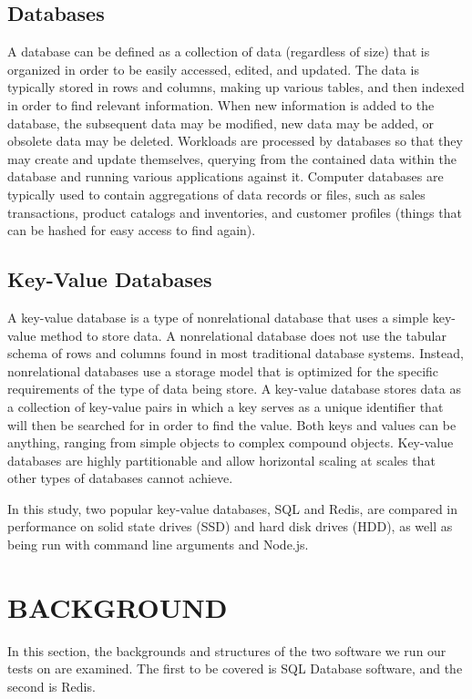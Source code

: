 \documentclass[letterpaper, 10 pt, conference]{ieeeconf}
\begin{document}
\subsection{Databases}
A database can be defined as a collection of data (regardless of size) that is organized in order to be easily accessed, edited, and updated. The data is typically stored in rows and columns, making up various tables, and then indexed in order to find relevant information. When new information is added to the database, the subsequent data may be modified, new data may be added, or obsolete data may be deleted. Workloads are processed by databases so that they may create and update themselves, querying from the contained data within the database and running various applications against it. Computer databases are typically used to contain aggregations of data records or files, such as sales transactions, product catalogs and inventories, and customer profiles (things that can be hashed for easy access to find again).

\subsection{Key-Value Databases}

A key-value database is a type of nonrelational database that uses a simple key-value method to store data. A nonrelational database does not use the tabular schema of rows and columns found in most traditional database systems. Instead, nonrelational databases use a storage model that is optimized for the specific requirements of the type of data being store. A key-value database stores data as a collection of key-value pairs in which a key serves as a unique identifier that will then be searched for in order to find the value. Both keys and values can be anything, ranging from simple objects to complex compound objects. Key-value databases are highly partitionable and allow horizontal scaling at scales that other types of databases cannot achieve. 

In this study, two popular key-value databases, SQL and Redis, are compared in performance on solid state drives (SSD) and hard disk drives (HDD), as well as being run with command line arguments and Node.js.

\section{BACKGROUND}

In this section, the backgrounds and structures of the two software we run our tests on are examined. The first to be covered is SQL Database software, and the second is Redis. 
\end{document}
